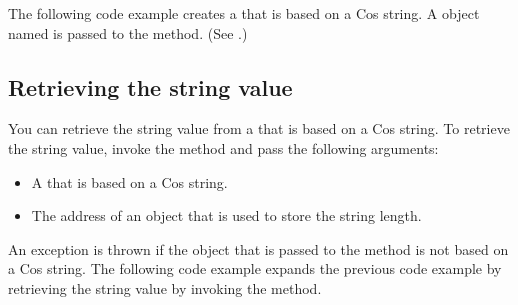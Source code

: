 \documentclass[letterpaper,12pt,english,openany,oneside]{sphinxmanual}
\begin{document}
The following code example creates a  that is based on a Cos string. A  object named  is passed to the  method. (See .)

\begin{sphinxVerbatim}[commandchars=\\\{\}]
    
   
   
      
\end{sphinxVerbatim}


\subsection{Retrieving the string value}
\label{\detokenize{Plugins_Cos:retrieving-the-string-value}}
You can retrieve the string value from a  that is based on a Cos string. To retrieve the string value, invoke the  method and pass the following arguments:
\begin{itemize}
\item {} 
A  that is based on a Cos string.

\item {} 
The address of an  object that is used to store the string length.

\end{itemize}

An exception is thrown if the  object that is passed to the  method is not based on a Cos string. The following code example expands the previous code example by retrieving the string value by invoking the  method.
\end{document}
